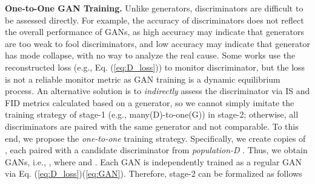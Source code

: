 \documentclass[runningheads]{llncs}
\begin{document}
\textbf{One-to-One GAN Training.} Unlike generators, discriminators are difficult to be assessed directly. For example, the accuracy of discriminators does not reflect the overall performance of GANs, as high accuracy may indicate that generators are too weak to fool discriminators, and low accuracy may indicate that generator has mode collapse, with no way to analyze the real cause. Some works \cite{Adversarialnas,AlphaGAN,costa2019coevolution} use the reconstructed loss (e.g., Eq. (\ref{eq:D_loss})) to monitor discriminator, but the loss is not a reliable monitor metric as GAN training is a dynamic equilibrium process. An alternative solution is to \textit{indirectly} assess the discriminator via IS and FID metrics calculated based on a generator, so we cannot simply imitate the training strategy of stage-1 (e.g., many(D)-to-one(G)) in stage-2; otherwise, all discriminators are paired with the same generator and not comparable. To this end, we propose the \textit{one-to-one} training strategy. Specifically, we create  copies of , each paired with a candidate discriminator from \textit{population-D} . Thus, we obtain  GANs, i.e., , where  and . Each GAN is independently trained as a regular GAN via Eq. (\ref{eq:D_loss})(\ref{eq:GAN}). Therefore, stage-2 can be formalized as follows
\end{document}
